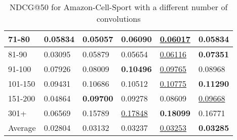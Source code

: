\begin{table*}[]
\begin{tabular}{|l|l|l|l|l|l|}
        71-80   & 0.05834                    & 0.05057                    & \textbf{0.06090}           & \underline{0.06017}        & 0.05834                    \\ \hline
        81-90   & 0.03095                    & 0.05879                    & 0.05654                    & \underline{0.06116}        & \textbf{0.07351}           \\ \hline
        91-100  & 0.07926                    & 0.08009                    & \textbf{0.10496}           & \underline{0.09765}        & 0.08968                    \\ \hline
        101-150 & 0.09431                    & 0.10686                    & 0.10512                    & \underline{0.10775}        & \textbf{0.11290}           \\ \hline
        151-200 & 0.04864                    & \textbf{0.09700}           & 0.09278                    & 0.08609                    & \underline{0.09668}        \\ \hline
        301+    & 0.06569                    & 0.15789                    & \underline{0.17848}        & \textbf{0.18099}           & 0.16771                    \\ \hline
        Average & 0.02804                    & 0.03132                    & 0.03237                    & \underline{0.03253}        & \textbf{0.03285}           \\ \hline
    \end{tabular}
    \caption{NDCG@50 for Amazon-Cell-Sport with a different number of convolutions}
    \label{tab:Amazon-cell-sport-con-evaluation}
\end{table*}

